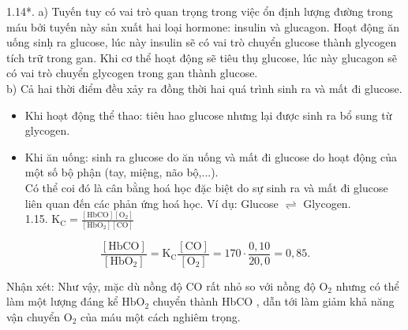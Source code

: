 \documentclass[10pt]{article}
\begin{document}
1.14*. a) Tuyến tuy có vai trò quan trọng trong việc ổn định lượng đường trong máu bởi tuyến này sản xuất hai loại hormone: insulin và glucagon. Hoạt động ăn uống sinḥ ra glucose, lúc này insulin sẽ có vai trò chuyển glucose thành glycogen tích trữ trong gan. Khi cơ thể hoạt động sẽ tiêu thụ glucose, lúc này glucagon sẽ có vai trò chuyển glycogen trong gan thành glucose.\\
b) Cả hai thời điểm đều xảy ra đồng thời hai quá trình sinh ra và mất đi glucose.

\begin{itemize}
  \item Khi hoạt động thể thao: tiêu hao glucose nhưng lại được sinh ra bổ sung từ glycogen.
  \item Khi ăn uống: sinh ra glucose do ăn uống và mất đi glucose do hoạt động của một số bộ phận (tay, miệng, não bộ,...).\\
Có thể coi đó là cân bằng hoá học đặc biệt do sự sinh ra và mất đi glucose liên quan đến các phản ứng hoá học. Ví dụ: Glucose $\rightleftharpoons$ Glycogen.\\
1.15. $\mathrm{K}_{\mathrm{C}}=\frac{[\mathrm{HbCO}]\left[\mathrm{O}_{2}\right]}{\left[\mathrm{HbO}_{2}\right][\mathrm{CO}]}$
\end{itemize}

$$
\frac{[\mathrm{HbCO}]}{\left[\mathrm{HbO}_{2}\right]}=\mathrm{K}_{\mathrm{C}} \frac{[\mathrm{CO}]}{\left[\mathrm{O}_{2}\right]}=170 \cdot \frac{0,10}{20,0}=0,85 .
$$

Nhận xét: Như vậy, mặc dù nồng độ CO rất nhỏ so với nồng độ $\mathrm{O}_{2}$ nhưng có thể làm một lượng đáng kể $\mathrm{HbO}_{2}$ chuyển thành HbCO , dẫn tới làm giảm khả năng vận chuyển $\mathrm{O}_{2}$ của máu một cách nghiêm trọng.
\end{document}
